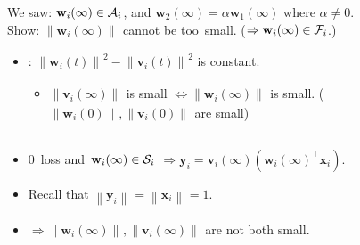 \documentclass[handout,usenames,dvipsnames]{beamer} %
\newcommand{\norm}[2][]{{\left\|{#2}\right\|_{#1}}}
\newcommand{\bx}{\mathbf{x}}
\newcommand{\bw}{\mathbf{w}}
\newcommand{\bv}{\mathbf{v}}
\newcommand{\by}{\mathbf{y}}
\newcommand{\ca}{{\cal A}}
\newcommand{\cf}{{\cal F}}
\newcommand{\cs}{{\cal S}}
\begin{document}
\begin{frame}
    We saw: $\bw_i(\infty) \in \ca_i$, and $\bw_2(\infty) = \alpha \bw_1(\infty)$ where $\alpha \neq 0$.\\
    Show: $\norm{\bw_i(\infty)}$ cannot be too~small. ($\Rightarrow \bw_i(\infty) \in \cf_i$.)
    \pause
    \begin{itemize}[<+->]
        \item \cite{du2018algorithmic}: $\norm{\bw_i(t)}^2 - \norm{\bv_i(t)}^2$ is constant.
        \begin{itemize}[<+->]
            \item $\norm{\bv_i(\infty)}$ is small $\Leftrightarrow \norm{\bw_i(\infty)}$ is small. ($\norm{\bw_i(0)}, \norm{\bv_i(0)}$ are small)
        \end{itemize}
    \end{itemize}
    \begin{columns}[T]
        \begin{column}{0.55\textwidth}
            \begin{itemize}[<+->]
                
                \item $0$~loss and~$\bw_i(\infty) \in \cs_i$ $\Rightarrow \by_i = \bv_i(\infty) (\bw_i(\infty)^\top \bx_i)$.
                \item Recall that $\norm{\by_i}=\norm{\bx_i}=1$.
                \item $\Rightarrow \norm{\bw_i(\infty)}, \norm{\bv_i(\infty)}$ are not both small.
            \end{itemize}
        \end{column}


\end{columns}
\end{frame}
\end{document}
